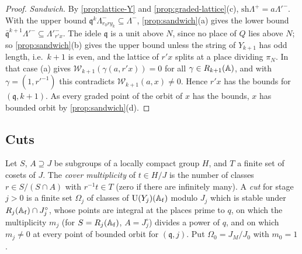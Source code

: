 \begin{proof}
\emph{Sandwich.} By \cref{prop:lattice-Y} and \cref{prop:graded-lattice}(c), $\mathrm{sh}\Lambda^+=a\Lambda'^-$. With the upper bound $\mathfrak q^k\Lambda^-_{r_0ry_k}\subseteq\Lambda^-$, \cref{prop:sandwich}(a) gives the lower bound $\bar{\mathfrak q}^{k+1}\Lambda'^-\subseteq\Lambda'^-_{r'x}$. The idele $\mathfrak q$ is a unit above $N$, since no place of
$Q$ lies above $N$; so \cref{prop:sandwich}(b) gives the upper bound unless the string of $Y_{k+1}$ has odd length, i.e.\ $k+1$ is even, and the lattice of $r'x$ splits at a place dividing $\pi_N$. In that case (a) gives $\mathcal W_{k+1}(\gamma(a,r'x))=0$ for all $\gamma\in R_{k+1}(\mathbb{A})$, and with $\gamma=(1,r'^{-1})$ this contradicts $\mathcal W_{k+1}(a,x)\ne0$.
Hence $r'x$ has the bounds for $(\mathfrak q,k+1)$. As every graded point of the orbit of $x$ has the bounds, $x$ has bounded orbit by \cref{prop:sandwich}(d).
\end{proof}

\subsection{Cuts}\label{ss:cuts}
Let $S$, $A\supseteq J$ be subgroups of a locally compact group $H$, and $T$ a finite set of cosets of $J$. The \emph{cover
multiplicity} of $t\in H/J$ is the number of classes $r\in S/(S\cap A)$ with $r^{-1}t\in T$ (zero if there are infinitely
many). A \emph{cut} for stage $j>0$ is a finite set $\Omega_j$ of classes of $\operatorname{U}(Y_j)(\mathbb{A}_{\mathrm f})$ modulo $J_j$ which is stable
under $R_j(\mathbb{A}_{\mathrm f})\cap J^\circ_j$, whose points are integral at the places prime to $q$, on which the multiplicity
$m_j$ (for $S=R_j(\mathbb{A}_{\mathrm f})$, $A=J^\circ_j$) divides a power of $q$, and on which $m_j\ne0$ at every point of bounded orbit for
$(\mathfrak q,j)$. Put $\Omega_0=J_M/J_0$ with $m_0=1$.

